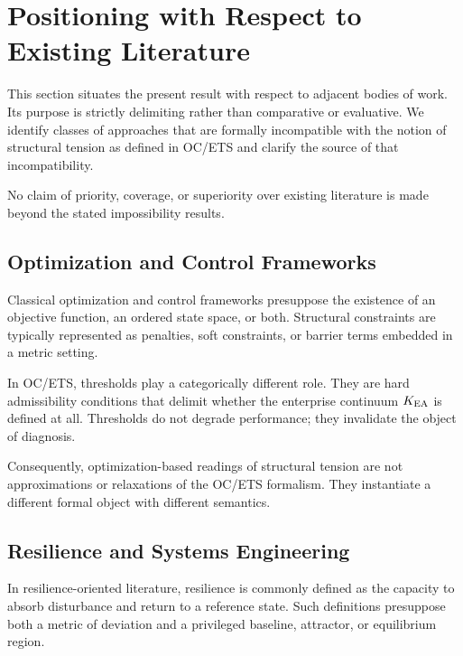 ﻿%

\section{Positioning with Respect to Existing Literature}

This section situates the present result with respect to adjacent bodies
of work. Its purpose is strictly delimiting rather than comparative or
evaluative. We identify classes of approaches that are formally
incompatible with the notion of structural tension as defined in OC/ETS
and clarify the source of that incompatibility.

No claim of priority, coverage, or superiority over existing literature
is made beyond the stated impossibility results.

\subsection{Optimization and Control Frameworks}

Classical optimization and control frameworks presuppose the existence of
an objective function, an ordered state space, or both. Structural
constraints are typically represented as penalties, soft constraints, or
barrier terms embedded in a metric setting.

In OC/ETS, thresholds play a categorically different role. They are hard
admissibility conditions that delimit whether the enterprise continuum
$K_{\mathrm{EA}}$ is defined at all. Thresholds do not degrade performance; they
invalidate the object of diagnosis.

Consequently, optimization-based readings of structural tension are not
approximations or relaxations of the OC/ETS formalism. They instantiate a
different formal object with different semantics.

\subsection{Resilience and Systems Engineering}

In resilience-oriented literature, resilience is commonly defined as the
capacity to absorb disturbance and return to a reference state. Such
definitions presuppose both a metric of deviation and a privileged
baseline, attractor, or equilibrium region.

